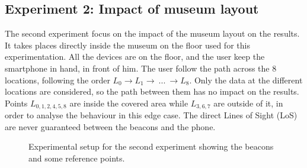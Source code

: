 \subsection{Experiment 2: Impact of museum layout}
\label{exp:2_museum}

The second experiment focus on the impact of the museum layout on the results. It takes places directly inside the museum on the floor used for this experimentation. All the devices are on the floor, and the user keep the smartphone in hand, in front of him. The user follow the path across the 8 locations, following the order $L_0 \rightarrow L_1 \rightarrow~...~\rightarrow L_8$. Only the data at the different locations are considered, so the path between them has no impact on the results. Points $L_{0,1,2,4,5,8}$ are inside the covered area while $L_{3,6,7}$ are outside of it, in order to analyse the behaviour in this edge case. The direct Lines of Sight (LoS) are never guaranteed between the beacons and the phone.

\begin{figure}[H]
    \centering
    \caption{Experimental setup for the second experiment showing the beacons and some reference points.}
    \label{fig:exp2_museum}
\end{figure}

